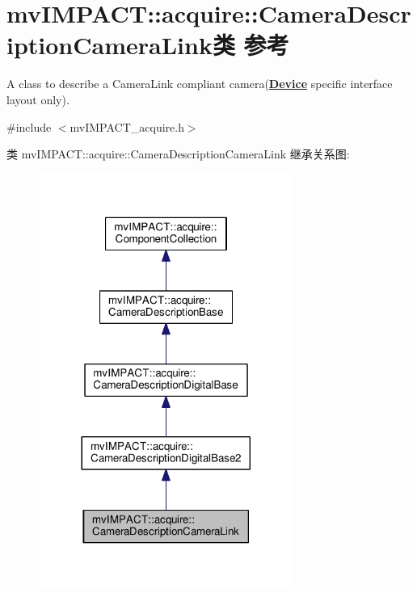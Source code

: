 \hypertarget{classmv_i_m_p_a_c_t_1_1acquire_1_1_camera_description_camera_link}{\section{mv\+I\+M\+P\+A\+C\+T\+:\+:acquire\+:\+:Camera\+Description\+Camera\+Link类 参考}
\label{classmv_i_m_p_a_c_t_1_1acquire_1_1_camera_description_camera_link}
}


A class to describe a Camera\+Link\textregistered{} compliant camera({\bfseries \hyperlink{classmv_i_m_p_a_c_t_1_1acquire_1_1_device}{Device}} specific interface layout only).  




{\ttfamily \#include $<$mv\+I\+M\+P\+A\+C\+T\+\_\+acquire.\+h$>$}



类 mv\+I\+M\+P\+A\+C\+T\+:\+:acquire\+:\+:Camera\+Description\+Camera\+Link 继承关系图\+:
\nopagebreak
\begin{figure}[H]
\begin{center}
\leavevmode
\includegraphics[width=236pt]{classmv_i_m_p_a_c_t_1_1acquire_1_1_camera_description_camera_link__inherit__graph}
\end{center}
\end{figure}


